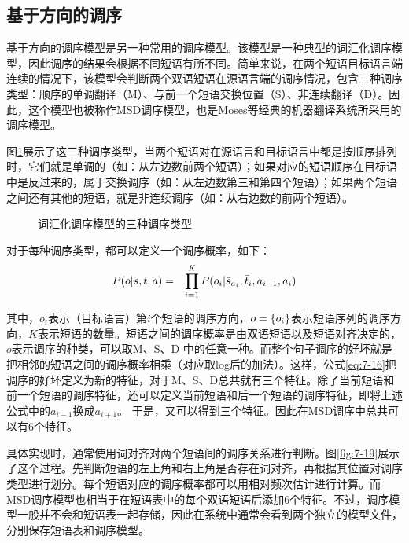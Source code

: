 
\subsection{基于方向的调序}

\parinterval 基于方向的调序模型是另一种常用的调序模型。该模型是一种典型的词汇化调序模型，因此调序的结果会根据不同短语有所不同。简单来说，在两个短语目标语言端连续的情况下，该模型会判断两个双语短语在源语言端的调序情况，包含三种调序类型：顺序的单调翻译（M）、与前一个短语交换位置（S）、非连续翻译（D）。因此，这个模型也被称作MSD调序模型，也是Moses等经典的机器翻译系统所采用的调序模型。

\parinterval 图\ref{fig:7-18}展示了这三种调序类型，当两个短语对在源语言和目标语言中都是按顺序排列时，它们就是单调的（如：从左边数前两个短语）；如果对应的短语顺序在目标语中是反过来的，属于交换调序（如：从左边数第三和第四个短语）；如果两个短语之间还有其他的短语，就是非连续调序（如：从右边数的前两个短语）。

\begin{figure}[htp]
\centering

\caption{词汇化调序模型的三种调序类型}
\label{fig:7-18}
\end{figure}

\parinterval 对于每种调序类型，都可以定义一个调序概率，如下：
\begin{eqnarray}
{P}({o}|{s},{t},{a}) & = & \prod_{i=1}^{K} {P}(o_i| \bar{s}_{a_i}, \bar{t}_i, a_{i-1}, a_i)
\label{eq:7-16}
\end{eqnarray}

\noindent 其中，$o_i$表示（目标语言）第$i$个短语的调序方向，${o}=\{o_i\}$表示短语序列的调序方向，$K$表示短语的数量。短语之间的调序概率是由双语短语以及短语对齐决定的，$o$表示调序的种类，可以取M、S、D 中的任意一种。而整个句子调序的好坏就是把相邻的短语之间的调序概率相乘（对应取log后的加法）。这样，公式\eqref{eq:7-16}把调序的好坏定义为新的特征，对于M、S、D总共就有三个特征。除了当前短语和前一个短语的调序特征，还可以定义当前短语和后一个短语的调序特征，即将上述公式中的$a_{i-1}$换成$a_{i+1}$。 于是，又可以得到三个特征。因此在MSD调序中总共可以有6个特征。

\parinterval 具体实现时，通常使用词对齐对两个短语间的调序关系进行判断。图\ref{fig:7-19}展示了这个过程。先判断短语的左上角和右上角是否存在词对齐，再根据其位置对调序类型进行划分。每个短语对应的调序概率都可以用相对频次估计进行计算。而MSD调序模型也相当于在短语表中的每个双语短语后添加6个特征。不过，调序模型一般并不会和短语表一起存储，因此在系统中通常会看到两个独立的模型文件，分别保存短语表和调序模型。

